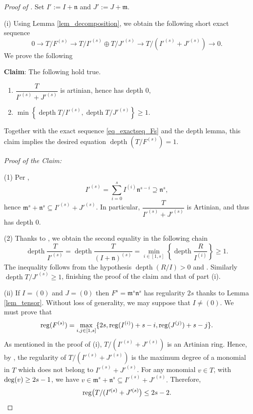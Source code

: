 \documentclass{amsart}
\DeclareMathOperator{\depth}{depth}
\DeclareMathOperator{\reg}{reg}
\newcommand{\mm}{\mathfrak{m}}
\newcommand{\nn}{\mathfrak{n}}
\theoremstyle{plain}
\theoremstyle{definition}
\numberwithin{equation}{section}
\begin{document}
\begin{proof}[Proof of ]
Set $I':=I+\mathfrak{n}$ and $J':=J+\mathfrak{m}$. 

(i) Using Lemma \ref{lem_decomposition}, we obtain the following short exact sequence
\begin{equation}
\label{eq_exactseq_Fs}
0 \longrightarrow T/F^{(s)}\longrightarrow T/I'^{(s)}\oplus T/J'^{(s)}\longrightarrow T/(I'^{(s)}+J'^{(s)})\longrightarrow 0.
\end{equation}
We prove the following

\textbf{Claim}: The following hold true.
\begin{enumerate}
 \item $\dfrac{T}{I'^{(s)}+J'^{(s)}}$ is artinian, hence has depth 0,
 \item $\min\left\{\depth T/I'^{(s)}, \depth T/J'^{(s)} \right\}\ge 1$.
\end{enumerate}
Together with the exact sequence \eqref{eq_exactseq_Fs} and the depth lemma, this claim implies the desired equation $\depth(T/F^{(s)})=1$.

\emph{Proof of the Claim:}

(1) Per , 
\[
I'^{(s)} =\sum_{i=0}^s I^{(i)}\nn^{s-i} \supseteq \nn^s,
\]
hence $\mm^s+\nn^s \subseteq I'^{(s)}+J'^{(s)}$. In particular, $\dfrac{T}{I'^{(s)}+J'^{(s)}}$ is Artinian, and thus has depth 0.

(2) Thanks to , we obtain the second equality in the following chain
\[
\depth \frac{T}{I'^{(s)}}= \depth \frac{T}{(I+\nn)^{(s)}}=\min_{i\in [1,s]} \left\{ \depth \frac{R}{I^{(i)}} \right\} \ge 1.
\]
The inequality follows from the hypothesis $\depth(R/I)>0$ and . Similarly $\depth T/J'^{(s)} \ge 1$, finishing the proof of the claim and that of part (i).


(ii) If $I=(0)$ and $J=(0)$ then $F^s=\mm^s\nn^s$ has regularity $2s$ thanks to Lemma \ref{lem_tensor}. Without loss of generality, we may suppose that $I\neq (0)$. We must prove that
$$\reg (F^{(s)})=\max_{i,j \in [1,s]} \{2s,\reg(I^{(i)})+s-i, {\rm reg}(J^{(j)})+s-j\}.$$
As mentioned in the proof of (i), $T/(I'^{(s)}+J'^{(s)})$ is an Artinian ring. Hence, by \cite[Theorem 18.4]{Pe11}, the regularity of $T/(I'^{(s)}+J'^{(s)})$ is the maximum degree of a monomial in $T$ which does not belong to $I'^{(s)}+J'^{(s)}$. For any monomial $v\in T$, with ${\rm deg}(v)\geq 2s-1$, we have $v\in \mathfrak{m}^s+\mathfrak{n}^s\subseteq I'^{(s)}+J'^{(s)}.$ Therefore,
\[
{\rm reg}\big(T/(I'^{(s)}+J'^{(s)}\big)\leq 2s-2.
\]


\end{proof}
\end{document}
